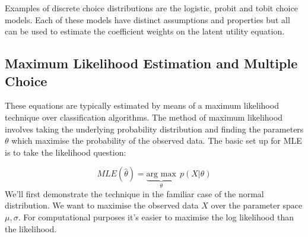 \documentclass[]{tufte-book}
\theoremstyle{definition}
\theoremstyle{definition}
\theoremstyle{definition}
\theoremstyle{remark}
\begin{document}
Examples of discrete choice distributions are the logistic, probit and tobit choice models. Each of these models have distinct assumptions and properties but all can be used to estimate the coefficient weights on the latent utility equation.

\hypertarget{maximum-likelihood-estimation-and-multiple-choice}{%
\subsection{Maximum Likelihood Estimation and Multiple Choice}\label{maximum-likelihood-estimation-and-multiple-choice}}

These equations are typically estimated by means of a maximum likelihood technique over classification algorithms. The method of maximum likelihood involves taking the underlying probability distribution and finding the parameters \(\theta\) which maximise the probability of the observed data. The basic set up for MLE is to take the likelihood question:

\[ MLE(\hat{\theta}) = \underbrace{\text{arg max}}_{\theta} \ \ p(X | \theta) \]
We'll first demonstrate the technique in the familiar case of the normal distribution. We want to maximise the observed data \(X\) over the parameter space \(\mu, \sigma\). For computational purposes it's easier to maximise the log likelihood than the likelihood.
\end{document}
